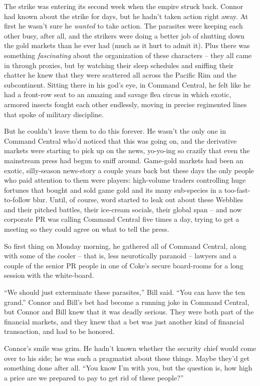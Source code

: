 The strike was entering its second week when the empire struck
back. Connor had known about the strike for days, but he hadn't
taken action right away. At first he wasn't sure he \emph{wanted}
to take action. The parasites were keeping each other busy, after
all, and the strikers were doing a better job of shutting down the
gold markets than he ever had (much as it hurt to admit it). Plus
there was something \emph{fascinating} about the organization of
these characters -- they all came in through proxies, but by
watching their sleep schedules and sniffing their chatter he knew
that they were scattered all across the Pacific Rim and the
subcontinent. Sitting there in his god's eye, in Command Central,
he felt like he had a front-row seat to an amazing and savage flea
circus in which exotic, armored insects fought each other
endlessly, moving in precise regimented lines that spoke of
military discipline.

But he couldn't leave them to do this forever. He wasn't the only
one in Command Central who'd noticed that this was going on, and
the derivative markets were starting to pick up on the news,
yo-yo-ing so crazily that even the mainstream press had begun to
sniff around. Game-gold markets had been an exotic, silly-season
news-story a couple years back but these days the only people who
paid attention to them were players: high-volume traders
controlling huge fortunes that bought and sold game gold and its
many sub-species in a too-fast-to-follow blur. Until, of course,
word started to leak out about these Webblies and their pitched
battles, their ice-cream socials, their global span -- and now
corporate PR was calling Command Central five times a day, trying
to get a meeting so they could agree on what to tell the press.

So first thing on Monday morning, he gathered all of Command
Central, along with some of the cooler -- that is, less
neurotically paranoid -- lawyers and a couple of the senior PR
people in one of Coke's secure board-rooms for a long session with
the white-board.

``We should just exterminate these parasites,'' Bill said. ``You can
have the ten grand.'' Connor and Bill's bet had become a running
joke in Command Central, but Connor and Bill knew that it was
deadly serious. They were both part of the financial markets, and
they knew that a bet was just another kind of financial
transaction, and had to be honored.

Connor's smile was grim. He hadn't known whether the security chief
would come over to his side; he was such a pragmatist about these
things. Maybe they'd get something done after all. ``You know I'm
with you, but the question is, how high a price are we prepared to
pay to get rid of these people?''

